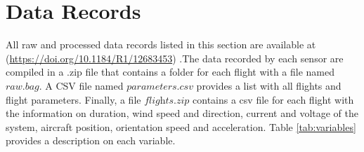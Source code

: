 \documentclass[fleqn,10pt]{wlscirep}
\begin{document}
\section*{Data Records}
All raw and processed data records listed in this section are available at (\href{https://doi.org/10.1184/R1/12683453}{https://doi.org/10.1184/R1/12683453}) \cite{Rodrigues}.The data recorded by each sensor are compiled in a .zip file that contains a folder for each flight with a file named $\textit{raw.bag}$. A CSV file named $\textit{parameters.csv}$ provides a list with all flights and flight parameters. Finally, a file $\textit{flights.zip}$ contains a csv file for each flight with the information on duration, wind speed and direction, current and voltage of the system, aircraft position, orientation speed and acceleration. Table \ref{tab:variables} provides a description on each variable.
\end{document}
